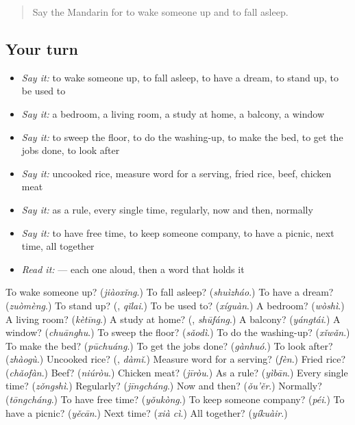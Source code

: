 \label{lesson:ZH-R163-review-158-163}



\begin{quote}
Say the Mandarin for to wake someone up and to fall asleep.
\end{quote}

\subsection*{Your turn}
\begin{itemize}
\raggedright
  \item \emph{Say it:} to wake someone up, to fall asleep, to have a dream, to stand up, to be used to
  \item \emph{Say it:} a bedroom, a living room, a study at home, a balcony, a window
  \item \emph{Say it:} to sweep the floor, to do the washing-up, to make the bed, to get the jobs done, to look after
  \item \emph{Say it:} uncooked rice, measure word for a serving, fried rice, beef, chicken meat
  \item \emph{Say it:} as a rule, every single time, regularly, now and then, normally
  \item \emph{Say it:} to have free time, to keep someone company, to have a picnic, next time, all together
  \item \emph{Read it:}   — each one aloud, then a word that holds it
\end{itemize}

\begin{tcolorbox}[breakable,colback=teal!4,colframe=teal!35!black,title={Before you move on}]
To wake someone up? (\emph{jiàoxǐng}.) To fall asleep? (\emph{shuìzháo}.) To have a dream? (\emph{zuòmèng}.) To stand up? (\textbf{}, \emph{qǐlai}.) To be used to? (\emph{xíguàn}.) A bedroom? (\emph{wòshì}.) A living room? (\emph{kètīng}.) A study at home? (\textbf{}, \emph{shūfáng}.) A balcony? (\emph{yángtái}.) A window? (\emph{chuānghu}.) To sweep the floor? (\emph{sǎodì}.) To do the washing-up? (\emph{xǐwǎn}.) To make the bed? (\emph{pūchuáng}.) To get the jobs done? (\emph{gànhuó}.) To look after? (\emph{zhàogù}.) Uncooked rice? (\textbf{}, \emph{dàmǐ}.) Measure word for a serving? (\emph{fèn}.) Fried rice? (\emph{chǎofàn}.) Beef? (\emph{niúròu}.) Chicken meat? (\emph{jīròu}.) As a rule? (\emph{yìbān}.) Every single time? (\emph{zǒngshì}.) Regularly? (\emph{jīngcháng}.) Now and then? (\emph{ǒu'ěr}.) Normally? (\emph{tōngcháng}.) To have free time? (\emph{yǒukòng}.) To keep someone company? (\emph{péi}.) To have a picnic? (\emph{yěcān}.) Next time? (\emph{xià cì}.) All together? (\emph{yíkuàir}.)
\end{tcolorbox}

